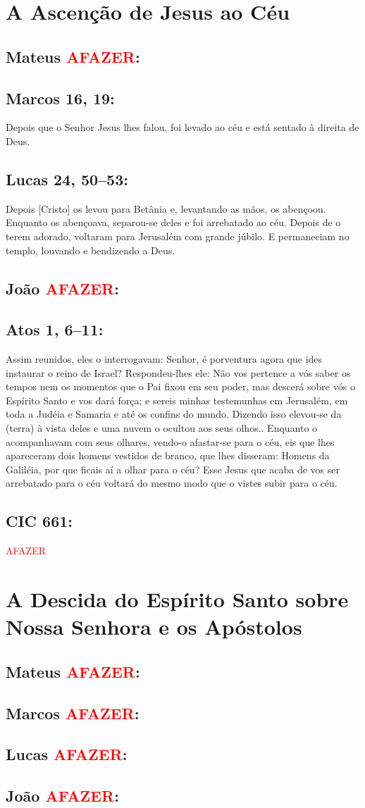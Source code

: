 \documentclass[10pt,a5paper]{book}
\newcommand{\from}[1]{\subsection*{#1}}
\newcommand{\TODO}{\textcolor{red}{\ttfamily AFAZER}}
\begin{document}

\section{A Ascenção de Jesus ao Céu}

\from{Mateus \TODO:}

\from{Marcos 16, 19:}

Depois que o Senhor Jesus lhes falou, foi levado ao céu e está sentado à direita de Deus.

\from{Lucas 24, 50--53:}

Depois [Cristo] os levou para Betânia e, levantando as mãos, os abençoou.
Enquanto os abençoava, separou-se deles e foi arrebatado ao céu.
Depois de o terem adorado, voltaram para Jerusalém com grande júbilo.
E permaneciam no templo, louvando e bendizendo a Deus.

\from{João \TODO:}

\from{Atos 1, 6--11:}

Assim reunidos, eles o interrogavam: Senhor, é porventura agora que ides instaurar o reino de Israel?
Respondeu-lhes ele: Não vos pertence a vós saber os tempos nem os momentos que o Pai fixou em seu poder,
mas descerá sobre vós o Espírito Santo e vos dará força; e sereis minhas testemunhas em Jerusalém, em toda a Judéia e Samaria e até os confins do mundo.
Dizendo isso elevou-se da (terra) à vista deles e uma nuvem o ocultou aos seus olhos..
Enquanto o acompanhavam com seus olhares, vendo-o afastar-se para o céu, eis que lhes apareceram dois homens vestidos de branco, que lhes disseram:
Homens da Galiléia, por que ficais aí a olhar para o céu? Esse Jesus que acaba de vos ser arrebatado para o céu voltará do mesmo modo que o vistes subir para o céu.

\from{CIC 661:}

\TODO


\section{A Descida do Espírito Santo sobre Nossa Senhora e os Apóstolos}

\from{Mateus \TODO:}

\from{Marcos \TODO:}

\from{Lucas \TODO:}

\from{João \TODO:}
\end{document}

